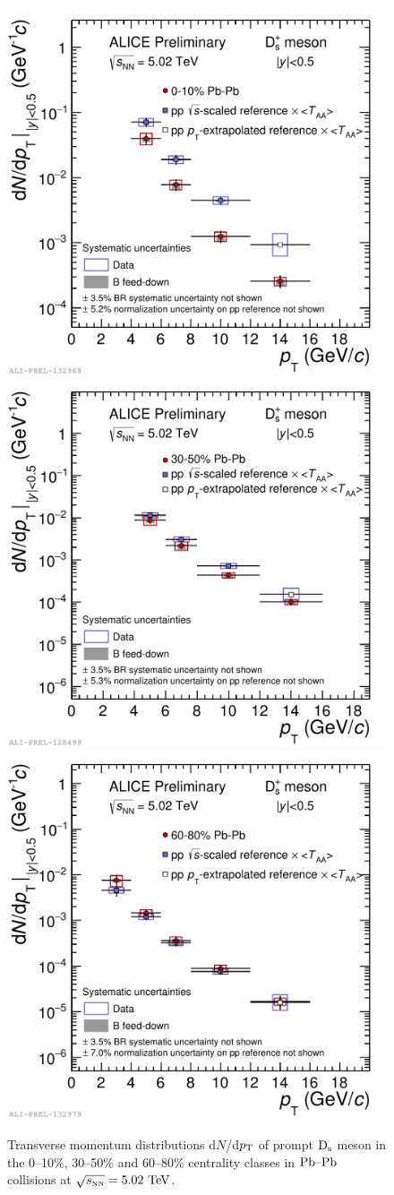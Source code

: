 \begin{figure}[!t]
 \begin{center}
\includegraphics[width=.49\textwidth]{FigCap5/Ds_dNdpt_010.pdf}
\includegraphics[width=.49\textwidth]{FigCap5/Ds_dNdpt_3050.pdf}
\includegraphics[width=.49\textwidth]{FigCap5/Ds_dNdpt_6080.pdf}
 \end{center}
 \caption{Transverse momentum distributions d$N$/d$p_{\rm T}$ of 
prompt ${\rm D_s}$ meson in the 0--10\%, 30--50\% and 60--80\% 
centrality classes in $\mbox{Pb--Pb}$ collisions 
at $\sqrt{s_{\rm \scriptscriptstyle NN}}=5.02~\mathrm{TeV}$. }
 \label{fig:DmesCorrYields010} 
\end{figure} 

